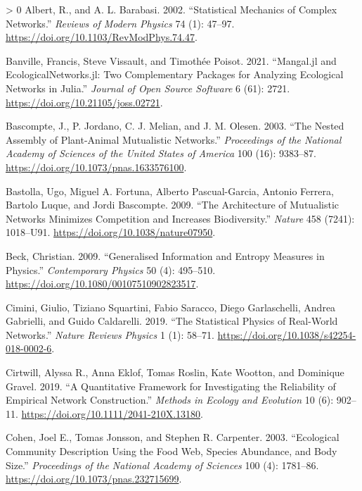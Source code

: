 \documentclass[10pt,oneside]{article}
\newlength{\cslhangindent}
\newenvironment{CSLReferences}[3] %
 {%
  \setlength{\parindent}{0pt}
  \ifodd #1 \everypar{\setlength{\hangindent}{\cslhangindent}}\ignorespaces\fi
  \ifnum #2 > 0
  \setlength{\parskip}{#2\baselineskip}
  \fi
 }%
 {}
\begin{document}
\hypertarget{refs}{}
\begin{CSLReferences}{1}{0}
\leavevmode\hypertarget{ref-Albert2002StaMec}{}%
Albert, R., and A. L. Barabasi. 2002. {``Statistical Mechanics of
Complex Networks.''} \emph{Reviews of Modern Physics} 74 (1): 47--97.
\url{https://doi.org/10.1103/RevModPhys.74.47}.

\leavevmode\hypertarget{ref-Banville2021ManJla}{}%
Banville, Francis, Steve Vissault, and Timothée Poisot. 2021.
{``Mangal.jl and EcologicalNetworks.jl: Two Complementary Packages for
Analyzing Ecological Networks in Julia.''} \emph{Journal of Open Source
Software} 6 (61): 2721. \url{https://doi.org/10.21105/joss.02721}.

\leavevmode\hypertarget{ref-Bascompte2003NesAssa}{}%
Bascompte, J., P. Jordano, C. J. Melian, and J. M. Olesen. 2003. {``The
Nested Assembly of Plant-Animal Mutualistic Networks.''}
\emph{Proceedings of the National Academy of Sciences of the United
States of America} 100 (16): 9383--87.
\url{https://doi.org/10.1073/pnas.1633576100}.

\leavevmode\hypertarget{ref-Bastolla2009ArcMut}{}%
Bastolla, Ugo, Miguel A. Fortuna, Alberto Pascual-Garcia, Antonio
Ferrera, Bartolo Luque, and Jordi Bascompte. 2009. {``The Architecture
of Mutualistic Networks Minimizes Competition and Increases
Biodiversity.''} \emph{Nature} 458 (7241): 1018--U91.
\url{https://doi.org/10.1038/nature07950}.

\leavevmode\hypertarget{ref-Beck2009GenInf}{}%
Beck, Christian. 2009. {``Generalised Information and Entropy Measures
in Physics.''} \emph{Contemporary Physics} 50 (4): 495--510.
\url{https://doi.org/10.1080/00107510902823517}.

\leavevmode\hypertarget{ref-Cimini2019StaPhy}{}%
Cimini, Giulio, Tiziano Squartini, Fabio Saracco, Diego Garlaschelli,
Andrea Gabrielli, and Guido Caldarelli. 2019. {``The Statistical Physics
of Real-World Networks.''} \emph{Nature Reviews Physics} 1 (1): 58--71.
\url{https://doi.org/10.1038/s42254-018-0002-6}.

\leavevmode\hypertarget{ref-Cirtwill2019QuaFrac}{}%
Cirtwill, Alyssa R., Anna Eklof, Tomas Roslin, Kate Wootton, and
Dominique Gravel. 2019. {``A Quantitative Framework for Investigating
the Reliability of Empirical Network Construction.''} \emph{Methods in
Ecology and Evolution} 10 (6): 902--11.
\url{https://doi.org/10.1111/2041-210X.13180}.

\leavevmode\hypertarget{ref-Cohen2003EcoComa}{}%
Cohen, Joel E., Tomas Jonsson, and Stephen R. Carpenter. 2003.
{``Ecological Community Description Using the Food Web, Species
Abundance, and Body Size.''} \emph{Proceedings of the National Academy
of Sciences} 100 (4): 1781--86.
\url{https://doi.org/10.1073/pnas.232715699}.


\end{CSLReferences}
\end{document}
